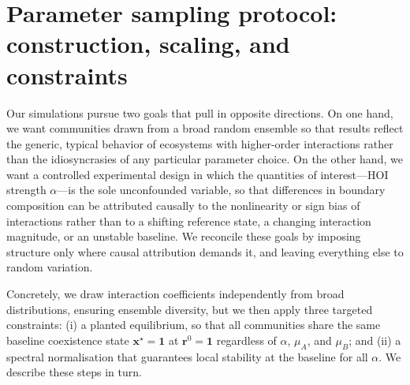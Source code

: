 \documentclass[pdflatex,sn-mathphys-num]{sn-jnl}%
\newcommand{\bone}{\mathbf{1}}
\newcommand{\bx}{\mathbf{x}}
\begin{document}



  

\section{Parameter sampling protocol: construction, scaling, and constraints}
\label{sec:si_sampling}

Our simulations pursue two goals that pull in opposite directions. On one hand, we want communities drawn from a broad random ensemble so that results reflect the generic, typical behavior of ecosystems with higher-order interactions rather than the idiosyncrasies of any particular parameter choice. On the other hand, we want a controlled experimental design in which the quantities of interest---HOI strength $\alpha$---is the sole unconfounded variable, so that differences in boundary composition can be attributed causally to the nonlinearity or sign bias of interactions rather than to a shifting reference state, a changing interaction magnitude, or an unstable baseline. We reconcile these goals by imposing structure only where causal attribution demands it, and leaving everything else to random variation.

Concretely, we draw interaction coefficients independently from broad distributions, ensuring ensemble diversity, but we then apply three targeted constraints: (i) a planted equilibrium, so that all communities share the same baseline coexistence state $\bx^\star = \bone$ at $\mathbf{r}^0 = \bone$ regardless of $\alpha$, $\mu_A$, and $\mu_B$; and (ii) a spectral normalisation that guarantees local stability at the baseline for all $\alpha$. We describe these steps in turn.
\end{document}
